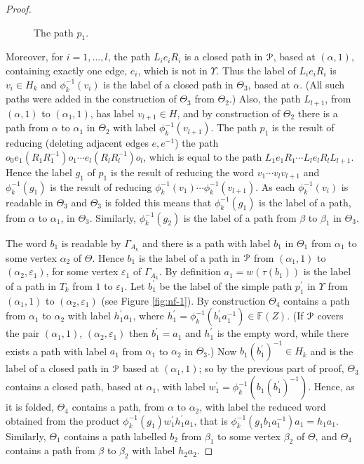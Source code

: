 \documentclass[a4paper,12pt]{article}
\renewcommand{\a}{\alpha }
\renewcommand{\b}{\beta }
\newcommand{\G}{\Gamma }
\newcommand{\e}{\varepsilon }
\newcommand{\T}{\Theta }
\renewcommand{\t}{\tau }
\newcommand{\U}{\Upsilon }
\newcommand{\cP}{{\cal{P}}}
\numberwithin{equation}{section}
\numberwithin{figure}{section}
\newcommand{\FF}{\ensuremath{\mathbb{F}}}
\begin{document}
\begin{proof}
\begin{figure}
\begin{center}
\end{center}
\caption{The path $p_1$.}
\label{fig:LeR}
\end{figure}
Moreover, for $i=1,\ldots ,l$,
the path $L_i e_i R_i$ is a closed path in $\cP$, based
at $(\a,1)$, containing exactly one edge, $e_i$, which is not in $\U$.
Thus the label of  $L_i e_i R_i$ is $v_i\in H_k$ and $\phi_k^{-1}(v_i)$ is the
label of a closed path in $\T_3$, based at  $\a$. (All such paths
were added in the construction of $\T_3$ from $\T_2$.)
Also, the path $L_{l+1}$, from $(\a,1)$ to $(\a_1,1)$, has
label $v_{l+1}\in H$,
and by construction of $\T_2$ there is a path from $\a$ to
$\a_1$ in $\T_2$ with label $\phi_k^{-1}(v_{l+1})$.
The path
$p_1$ is the result of reducing (deleting adjacent edges $e,e^{-1}$) the path
$o_0 e_1 (R_1 R_1^{-1}) o_1 \cdots e_{l}(R_l R_l^{-1}) o_{l}$, which
is equal to the path $L_1 e_1 R_1 \cdots L_l e_l R_l L_{l+1}$. Hence the label $g_1$
of $p_1$ is the result of
reducing the word $v_1\cdots v_l v_{l+1}$
 and $\phi_k^{-1}(g_1)$ is the result of
reducing $\phi_k^{-1}(v_1) \cdots \phi_k^{-1}(v_{l+1})$. As each $\phi_k^{-1}(v_i)$ is readable
in $\T_3$ and $\T_3$ is folded this means  that $\phi_k^{-1}(g_1)$ is the
label of a path, from $\a$ to   $\a_1$, in $\T_3$. Similarly,
$\phi_k^{-1}(g_2)$
is the label of a path from $\b$ to $\b_1$ in $\T_3$.

The word $b_1$ is readable by $\G_{A_k}$ and there
is a path with label $b_1$ in $\T_1$ from $\a_1$ to some vertex $\a_2$
of $\T$.
Hence $b_1$ is the label of a path in $\cP$ from $(\a_1,1)$ to
$(\a_2,\e_1)$, for some vertex $\e_1$ of $\G_{A_k}$.
By definition $a_1=w(\t(b_1))$ is the label of a path in $T_k$ from $1$ to $\e_1$.
Let $b_1^\prime$
 be the label of the simple path $p_1^\prime$ in $\U$ from
$(\a_1,1)$ to $(\a_2,\e_1)$ (see Figure \ref{fig:nf-1}). By construction $\T_4$ contains a path
from $\a_1$ to $\a_2$ with label $h_1^\prime a_1$, where
$h_1^\prime =\phi_k^{-1}(b_1^\prime a_1^{-1})\in \FF(Z)$.
(If $\cP$ covers the pair $(\a_1,1)$, $(\a_2,\e_1)$ then
$b_1^\prime=a_1$ and $h_1^\prime$ is the empty word, while there
exists a path with label $a_1$ from $\a_1$ to $\a_2$ in $\T_3$.)
Now $b_1(b_1^\prime)^{-1}\in H_k$ and is the label of a closed
path  in $\cP$ based at $(\a_1,1)$; so by the
previous part of proof, $\T_3$ contains a closed path, based at $\a_1$,
 with label
$w_1^\prime=\phi_k^{-1}(b_1(b_1^\prime)^{-1})$. Hence, as it is folded,
$\T_4$ contains a path, from $\a$ to $\a_2$,
with label the reduced word obtained from the product
$\phi_k^{-1}(g_1)w_1^{\prime} h_1^\prime a_1$, that is
 $\phi_k^{-1}(g_1b_1a_1^{-1}) a_1=h_1a_1$.
 Similarly, $\T_1$ contains a path labelled $b_2$ from $\b_1$ to
some vertex $\b_2$ of $\T$, and $\T_4$ contains a path from
$\b$ to $\b_2$ with label $h_2a_2$.


\end{proof}
\end{document}
